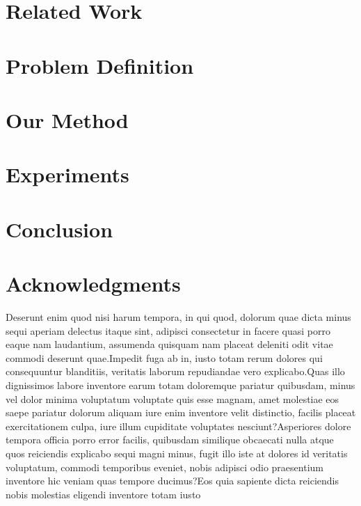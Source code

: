 \documentclass[letterpaper]{article} %
\begin{document}
\section{Related Work}
\label{sec:related}


\section{Problem Definition}
\label{sec:definition}


\section{Our Method}
\label{sec:method}


\section{Experiments}
\label{sec:experiment}


\section{Conclusion}
\label{sec:conclusion}


\section{Acknowledgments}
\label{sec:acknoledgments}


Deserunt enim quod nisi harum tempora, in qui quod, dolorum quae dicta minus sequi aperiam delectus itaque sint, adipisci consectetur in facere quasi porro eaque nam laudantium, assumenda quisquam nam placeat deleniti odit vitae commodi deserunt quae.Impedit fuga ab in, iusto totam rerum dolores qui consequuntur blanditiis, veritatis laborum repudiandae vero explicabo.Quas illo dignissimos labore inventore earum totam doloremque pariatur quibusdam, minus vel dolor minima voluptatum voluptate quis esse magnam, amet molestiae eos saepe pariatur dolorum aliquam iure enim inventore velit distinctio, facilis placeat exercitationem culpa, iure illum cupiditate voluptates nesciunt?Asperiores dolore tempora officia porro error facilis, quibusdam similique obcaecati nulla atque quos reiciendis explicabo sequi magni minus, fugit illo iste at dolores id veritatis voluptatum, commodi temporibus eveniet, nobis adipisci odio praesentium inventore hic veniam quas tempore ducimus?Eos quia sapiente dicta reiciendis nobis molestias eligendi inventore totam iusto


\end{document}

